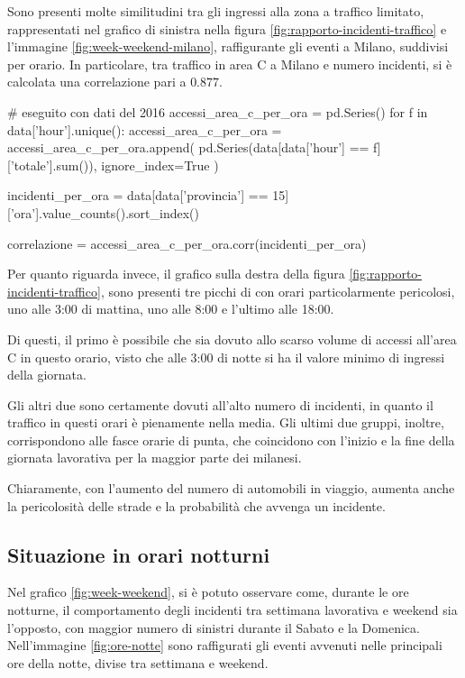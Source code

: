 \documentclass[a4paper,12pt]{report}
\begin{document}
Sono presenti molte similitudini tra gli ingressi alla zona a traffico limitato, 
rappresentati nel grafico di sinistra nella 
figura \ref{fig:rapporto-incidenti-traffico} e l'immagine \ref{fig:week-weekend-milano}, 
raffigurante gli eventi a Milano, suddivisi per orario. 
In particolare, tra traffico in area C a Milano e 
numero incidenti, si è calcolata una correlazione pari a $0.877$. 

\begin{code}
# eseguito con dati del 2016
accessi_area_c_per_ora = pd.Series()
for f in data['hour'].unique():
    accessi_area_c_per_ora = accessi_area_c_per_ora.append(
        pd.Series(data[data['hour'] == f]['totale'].sum()), 
        ignore_index=True
        )

incidenti_per_ora = data[data['provincia'] == 15]['ora'].value_counts().sort_index()

correlazione = accessi_area_c_per_ora.corr(incidenti_per_ora)
\end{code}

Per quanto riguarda invece, il grafico sulla destra della 
figura \ref{fig:rapporto-incidenti-traffico}, sono presenti tre picchi di 
con orari particolarmente pericolosi, uno alle 3:00 di mattina, uno alle 
8:00 e l'ultimo alle 18:00. 

Di questi, il primo è possibile che sia dovuto allo scarso volume di accessi 
all'area C in questo orario, visto che alle 3:00 di notte si ha il valore minimo di 
ingressi della giornata. 

Gli altri due sono certamente dovuti all'alto 
numero di incidenti, in quanto il traffico in questi orari è pienamente nella media. 
Gli ultimi due gruppi, inoltre, corrispondono alle fasce orarie di punta, che coincidono 
con l'inizio e la fine della giornata lavorativa per la maggior parte dei milanesi. 

Chiaramente, con l'aumento del numero di automobili in viaggio, aumenta anche 
la pericolosità delle strade e la probabilità che avvenga un incidente. 

\subsection{Situazione in orari notturni}

Nel grafico \ref{fig:week-weekend}, si è potuto osservare come, durante le 
ore notturne, il comportamento degli incidenti tra settimana lavorativa e weekend 
sia l'opposto, con maggior numero di sinistri durante il 
Sabato e la Domenica. 
Nell'immagine \ref{fig:ore-notte} sono raffigurati gli eventi avvenuti 
nelle principali ore della notte, divise tra settimana e weekend. 
\end{document}
